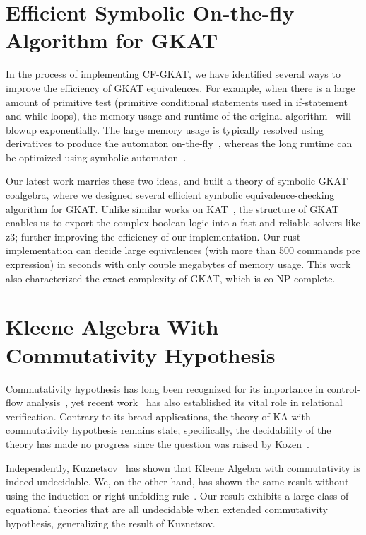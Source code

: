 \documentclass[11pt,a4paper,sans]{moderncv} %
\begin{document}
\section{Efficient Symbolic On-the-fly Algorithm for GKAT}

In the process of implementing CF-GKAT, we have identified several ways to improve the efficiency of GKAT equivalences.
For example, when there is a large amount of primitive test (primitive conditional statements used in if-statement and while-loops), the memory usage and runtime of the original algorithm~\cite{smolka_GuardedKleeneAlgebra_2020} will blowup exponentially. 
The large memory usage is typically resolved using derivatives to produce the automaton on-the-fly~\cite{brzozowski_DerivativesRegularExpressions_1964, schmid_GuardedKleeneAlgebra_2021}, whereas the long runtime can be optimized using symbolic automaton~\cite{pous_SymbolicAlgorithmsLanguage_2015}. 

Our latest work marries these two ideas, and built a theory of symbolic GKAT coalgebra, where we designed several efficient symbolic equivalence-checking algorithm for GKAT. 
Unlike similar works on KAT~\cite{pous_SymbolicAlgorithmsLanguage_2015}, the structure of GKAT enables us to export the complex boolean logic into a fast and reliable solvers like z3; further improving the efficiency of our implementation.
Our rust implementation can decide large equivalences (with more than 500 commands pre expression) in seconds with only couple megabytes of memory usage.
This work also characterized the exact complexity of GKAT, which is co-NP-complete.


\section{Kleene Algebra With Commutativity Hypothesis}

Commutativity hypothesis has long been recognized for its importance in control-flow analysis~\cite{kozen_KleeneAlgebraTests_1996}, yet recent work~\cite{antonopoulos_AlgebraAlignmentRelational_2023} has also established its vital role in relational verification. 
Contrary to its broad applications, the theory of KA with commutativity hypothesis remains stale; specifically, the decidability of the theory has made no progress since the question was raised by Kozen~\cite{kozen_KleeneAlgebraTests_1996}.

Independently, Kuznetsov~\cite{kuznetsov_ComplexityReasoningKleene_2023} has shown that Kleene Algebra with commutativity is indeed undecidable. We, on the other hand, has shown the same result without using the induction or right unfolding rule~\cite{azevedodeamorim_KleeneAlgebraCommutativity_2024}. 
Our result exhibits a large class of equational theories that are all undecidable when extended commutativity hypothesis, generalizing the result of Kuznetsov.
\end{document}
